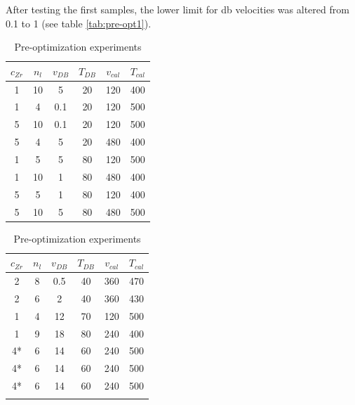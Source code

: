 After testing the first samples, the lower limit for \gls{db} velocities was altered from 0.1 to 1 (see table \ref{tab:pre-opt1}).
\begin{table}[hbt]
	\centering
	\caption{Pre-optimization experiments}
	\label{tab:pre-opt}
	\begin{subtable}{0.5\linewidth}
		\centering
		\label{tab:pre-opt1}
		\begin{tabular}{cccccc}
			\hline
			\hline
			$c_{Zr}$	&$n_l$	&$v_{DB}$	&$T_{DB}$	&$v_{cal}$	&$T_{cal}$		\\
			\hline
	1	&10	&5	&20	&120	&400	\\
	1	&4	&0.1	&20	&120	&500	\\
	5	&10	&0.1	&20	&120	&500	\\
	5	&4	&5	&20	&480	&400	\\
	1	&5	&5	&80	&120	&500	\\
	1	&10	&1	&80	&480	&400	\\
	5	&5	&1	&80	&120	&400	\\
	5	&10	&5	&80	&480	&500	\\
			\hline\hline
		\end{tabular}
	\end{subtable}%
	\begin{subtable}{0.5\linewidth}
		\centering
		\label{tab:pre-opt2}
		\begin{tabular}{cccccc}
			\hline\hline
			$c_{Zr}$	&$n_l$	&$v_{DB}$	&$T_{DB}$	&$v_{cal}$	&$T_{cal}$		\\
			\hline
	2	&8	&0.5	&40	&360	&470	\\
	2	&6	&2	&40	&360	&430	\\
	1	&4	&12	&70	&120	&500	\\
	1	&9	&18	&80	&240	&400	\\
	4*	&6	&14	&60	&240	&500	\\
	4*	&6	&14	&60	&240	&500	\\
	4*	&6	&14	&60	&240	&500	\\
			\hline
			\hline
			\\
		\end{tabular}
	\end{subtable}
\end{table}


